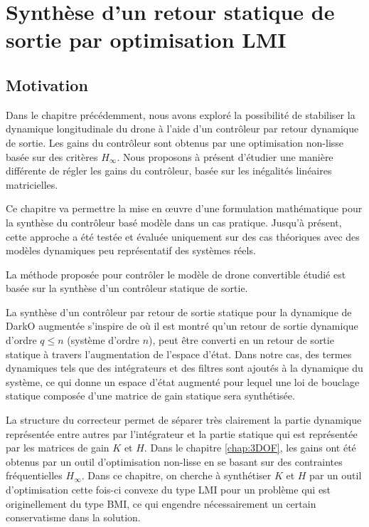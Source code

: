 \chapter{Synthèse d'un retour statique de sortie par optimisation LMI}
\minitoc
\label{chap:LMI}

\section{Motivation}
\label{sec:motivationLMI}

Dans le chapitre précédemment, nous avons exploré la possibilité de stabiliser la dynamique longitudinale du drone à l'aide d'un contrôleur par retour dynamique de sortie. Les gains du contrôleur sont obtenus par une optimisation non-lisse basée sur des critères $H_{\infty}$. Nous proposons à présent d'étudier une manière différente de régler les gains du contrôleur, basée sur les inégalités linéaires matricielles.

Ce chapitre va permettre la mise en œuvre d'une formulation mathématique pour la synthèse du contrôleur basé modèle dans un cas pratique. Jusqu'à présent, cette approche a été testée et évaluée uniquement sur des cas théoriques \cite{Arzelier2018} avec des modèles dynamiques peu représentatif des systèmes réels. 

La méthode proposée pour contrôler le modèle de drone convertible étudié est basée sur la synthèse d'un contrôleur statique de sortie. 

La synthèse d'un contrôleur par retour de sortie statique pour la dynamique de DarkO augmentée s'inspire de \cite{SYRMOS1997125} où il est montré qu'un retour de sortie dynamique d'ordre $q \leq n$ (système d'ordre $n$), peut être converti en un retour de sortie statique à travers l'augmentation de l'espace d'état. Dans notre cas, des termes dynamiques tels que des intégrateurs et des filtres sont ajoutés à la dynamique du système, ce qui donne un espace d'état augmenté pour lequel une loi de bouclage statique composée d'une matrice de gain statique sera synthétisée.

La structure du correcteur permet de séparer  très clairement la partie dynamique représentée entre autres par l'intégrateur et la partie statique  qui est représentée par les matrices de gain $K$ et $H$. Dans le chapitre \ref{chap:3DOF}, les gains ont été obtenus par un outil d'optimisation non-lisse en se basant sur des contraintes fréquentielles $H_{\infty}$. Dans ce chapitre, on cherche à synthétiser $K$ et $H$ par un outil d'optimisation cette fois-ci convexe du type LMI pour un problème qui est originellement du type BMI, ce qui engendre nécessairement un certain conservatisme dans la solution.

